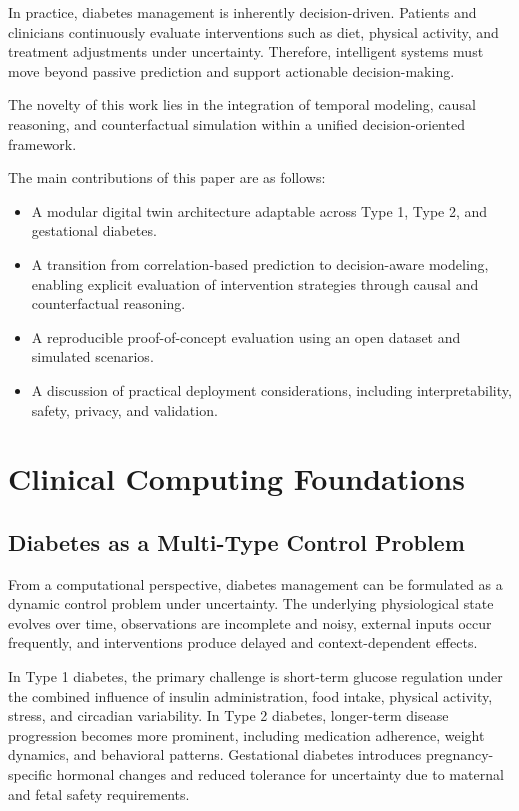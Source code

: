 \documentclass[journal]{IEEEtran}
\begin{document}
In practice, diabetes management is inherently decision-driven. Patients and clinicians continuously evaluate interventions such as diet, physical activity, and treatment adjustments under uncertainty. Therefore, intelligent systems must move beyond passive prediction and support actionable decision-making.

The novelty of this work lies in the integration of temporal modeling, causal reasoning, and counterfactual simulation within a unified decision-oriented framework.

The main contributions of this paper are as follows:
\begin{itemize}
\item A modular digital twin architecture adaptable across Type 1, Type 2, and gestational diabetes.
\item A transition from correlation-based prediction to decision-aware modeling, enabling explicit evaluation of intervention strategies through causal and counterfactual reasoning.
\item A reproducible proof-of-concept evaluation using an open dataset and simulated scenarios.
\item A discussion of practical deployment considerations, including interpretability, safety, privacy, and validation.
\end{itemize}

\section{Clinical Computing Foundations}
\subsection{Diabetes as a Multi-Type Control Problem}
From a computational perspective, diabetes management can be formulated as a dynamic control problem under uncertainty. The underlying physiological state evolves over time, observations are incomplete and noisy, external inputs occur frequently, and interventions produce delayed and context-dependent effects.

In Type 1 diabetes, the primary challenge is short-term glucose regulation under the combined influence of insulin administration, food intake, physical activity, stress, and circadian variability. In Type 2 diabetes, longer-term disease progression becomes more prominent, including medication adherence, weight dynamics, and behavioral patterns. Gestational diabetes introduces pregnancy-specific hormonal changes and reduced tolerance for uncertainty due to maternal and fetal safety requirements.
\end{document}
